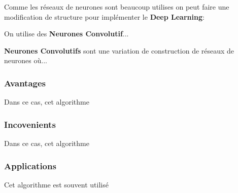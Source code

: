\documentclass{article}
\begin{document}
Comme les réseaux de neurones sont beaucoup utilises on peut faire une modification de structure pour implémenter le \textbf{Deep Learning}:
\begin{definition}
    On utilise des \textbf{Neurones Convolutif}...

    \begin{remark}
        \textbf{Neurones Convolutifs} sont une variation de construction de réseaux de neurones où...
    \end{remark}
\end{definition}
\subsubsection{Avantages}
Dans ce cas, cet algorithme 

\subsubsection{Incovenients}
Dans ce cas, cet algorithme 

\subsubsection{Applications}
Cet algorithme est souvent utilisé 





\end{document}

